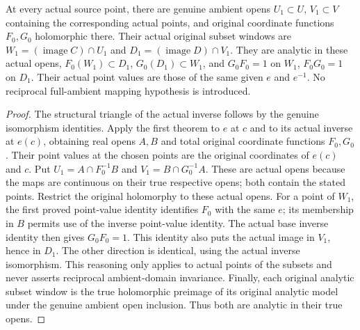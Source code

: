 \begin{theorem}
\label{hir:actual-intrinsic-iso-paired-original-windows}
\leanok
At every actual source point, there are genuine ambient opens
$U_1\subset U$, $V_1\subset V$ containing the corresponding actual
points, and original coordinate functions $F_0,G_0$ holomorphic there.
Their actual original subset windows are
$W_1=(\operatorname{image}C)\cap U_1$ and
$D_1=(\operatorname{image}D)\cap V_1$. They are analytic in these actual
opens, $F_0(W_1)\subset D_1$, $G_0(D_1)\subset W_1$, and
$G_0F_0=1$ on $W_1$, $F_0G_0=1$ on $D_1$.
Their actual point values are those of the same given $e$ and $e^{-1}$.
No reciprocal full-ambient mapping hypothesis is introduced.
\end{theorem}
\begin{proof}
The structural triangle of the actual inverse follows by the genuine
isomorphism identities. Apply the first theorem to $e$ at $c$ and to its
actual inverse at $e(c)$, obtaining real opens $A,B$ and total original
coordinate functions $F_0,G_0$. Their point values at the chosen points
are the original coordinates of $e(c)$ and $c$. Put
$U_1=A\cap F_0^{-1}B$ and $V_1=B\cap G_0^{-1}A$.
These are actual opens because the maps are continuous on their true
respective opens; both contain the stated points. Restrict the original
holomorphy to these actual opens. For a point of $W_1$, the first proved
point-value identity identifies $F_0$ with the same $e$; its membership
in $B$ permits use of the inverse point-value identity. The actual base
inverse identity then gives $G_0F_0=1$. This identity also puts the actual
image in $V_1$, hence in $D_1$. The other direction is identical, using
the actual inverse isomorphism. This reasoning only applies to actual
points of the subsets and never asserts reciprocal ambient-domain
invariance. Finally, each original analytic subset window is the true
holomorphic preimage of its original analytic model under the genuine
ambient open inclusion. Thus both are analytic in their true opens.
\end{proof}

